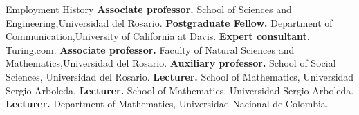 \begin{rubric}{Employment History}
%
	\textbf{Associate professor.} School of Sciences and Engineering,\newline Universidad del Rosario.
%
%
	\textbf{Postgraduate Fellow.} Department of Communication,\newline University of California at Davis.
%
\entry*[2024 -- 2025]%
	\textbf{Expert consultant.} Turing.com.
%
\entry*[2010 -- 2019]%
	\textbf{Associate professor.} Faculty of Natural Sciences and Mathematics,\newline  Universidad del Rosario.
%
\entry*[07/2006 -- 2010]%
	\textbf{Auxiliary professor.} School of Social Sciences,  Universidad del Rosario.
%
\entry*[02/2006 -- 06/2006]%
	\textbf{Lecturer.} School of Mathematics, Universidad Sergio Arboleda.
%
\entry*[02/2004 -- 06/2004]%
	\textbf{Lecturer.} School of Mathematics, Universidad Sergio Arboleda.
%
\entry*[2003 -- 2004]%
	\textbf{Lecturer.} Department of Mathematics,  Universidad Nacional de Colombia.
\end{rubric}
